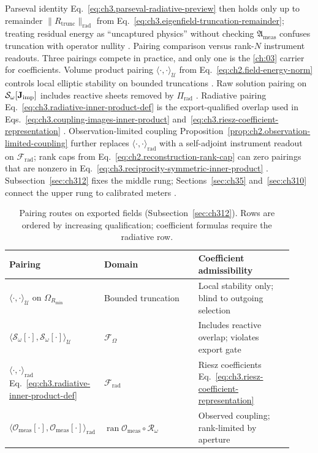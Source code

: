 Parseval identity Eq.~\eqref{eq:ch3.parseval-radiative-preview} then holds only up to remainder
\(\|R_{\mathrm{trunc}}\|_{\mathrm{rad}}\) from Eq.~\eqref{eq:ch3.eigenfield-truncation-remainder}; treating
residual energy as ``uncaptured physics'' without checking \(\mathfrak{A}_{\mathrm{meas}}\) confuses
truncation with operator nullity \cite{stratton1941}.
Pairing comparison versus rank-$N$ instrument readouts. Three pairings compete in practice, and only one is the \ref{ch:03} carrier for coefficients.
Volume product pairing \(\langle\cdot,\cdot\rangle_{\mathcal{U}}\) from
Eq.~\eqref{eq:ch2.field-energy-norm} controls local elliptic stability on bounded truncations
\cite{stratton1941}. Raw solution pairing on \(\mathcal{S}_\omega[\mathbf{J}_{\mathrm{imp}}]\) includes reactive sheets
removed by \(\Pi_{\mathrm{rad}}\) \cite{harrington2001}. Radiative pairing
Eq.~\eqref{eq:ch3.radiative-inner-product-def} is the export-qualified overlap used in
Eqs.~\eqref{eq:ch3.coupling-images-inner-product} and~\eqref{eq:ch3.riesz-coefficient-representation}
\cite{stratton1941}. Observation-limited coupling Proposition~\ref{prop:ch2.observation-limited-coupling}
further replaces \(\langle\cdot,\cdot\rangle_{\mathrm{rad}}\) with a self-adjoint instrument readout on
\(\mathcal{F}_{\mathrm{rad}}\); rank caps from Eq.~\eqref{eq:ch2.reconstruction-rank-cap} can zero
pairings that are nonzero in Eq.~\eqref{eq:ch3.reciprocity-symmetric-inner-product}
\cite{harrington2001}. Subsection~\ref{sec:ch312} fixes the middle rung; Sections~\ref{sec:ch35}
and~\ref{sec:ch310} connect the upper rung to calibrated meters \cite{stratton1941}.
\begin{table}[t]
\centering
\caption{Pairing routes on exported fields (Subsection~\ref{sec:ch312}). Rows are ordered by increasing
qualification; coefficient formulas require the radiative row.}
\label{tab:ch3.pairing-hierarchy}
\small
\begin{tabular}{@{}p{0.24\linewidth}p{0.34\linewidth}p{0.34\linewidth}@{}}
\toprule
Pairing & Domain & Coefficient admissibility \\
\midrule
\(\langle\cdot,\cdot\rangle_{\mathcal{U}}\) on \(\Omega_{R_{\min}}\) &
Bounded truncation &
Local stability only; blind to outgoing selection \\
\addlinespace
\(\langle \mathcal{S}_\omega[\cdot],\mathcal{S}_\omega[\cdot]\rangle_{\mathcal{U}}\) &
\(\mathcal{F}_\Omega\) &
Includes reactive overlap; violates export gate \\
\addlinespace
\(\langle\cdot,\cdot\rangle_{\mathrm{rad}}\) Eq.~\eqref{eq:ch3.radiative-inner-product-def} &
\(\mathcal{F}_{\mathrm{rad}}\) &
Riesz coefficients Eq.~\eqref{eq:ch3.riesz-coefficient-representation} \\
\addlinespace
\(\langle \mathcal{O}_{\mathrm{meas}}[\cdot],\mathcal{O}_{\mathrm{meas}}[\cdot]\rangle_{\mathrm{rad}}\) &
\(\operatorname{ran}\mathcal{O}_{\mathrm{meas}}\circ\mathcal{R}_\omega\) &
Observed coupling; rank-limited by aperture \\
\bottomrule
\end{tabular}
\end{table}
